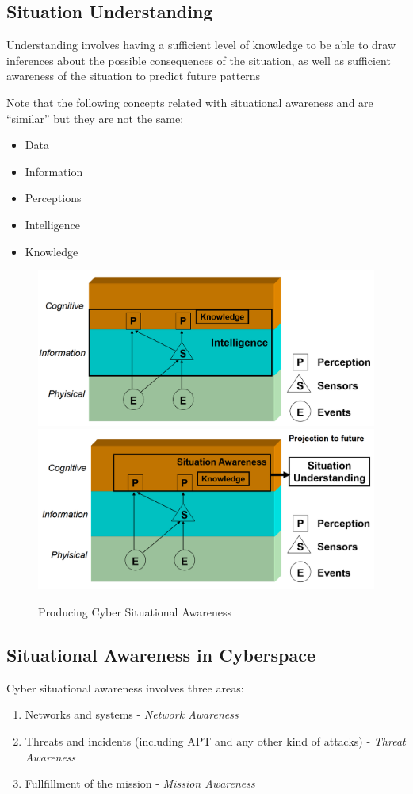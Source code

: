 \subsection{Situation Understanding}
\begin{definition}
   Understanding involves having a sufficient level of knowledge to be able to draw
   inferences about the possible consequences of the situation, as well as sufficient
   awareness of the situation to predict future patterns
\end{definition}

{Note that the following concepts related with situational awareness and are ``similar'' but they are not the same:\ns
\begin{itemize}
   \item Data
   \item Information
   \item Perceptions
   \item Intelligence
   \item Knowledge
\end{itemize}}

\begin{figure}[htbp]
   \centering
   \includegraphics[width=0.45\columnwidth]{images/01/producingCS1.png}
   \includegraphics[width=0.45\columnwidth]{images/01/producingCS2.png}
   \caption{Producing Cyber Situational Awareness}
   \label{fig:01/producingCS}
\end{figure}


\subsection{Situational Awareness in Cyberspace}
Cyber situational awareness involves three areas:
\begin{enumerate}
	\item Networks and systems - \textit{Network Awareness}
	\item Threats and incidents (including APT and any other kind of attacks) - \textit{Threat Awareness}
	\item Fullfillment of the mission - \textit{Mission Awareness}
\end{enumerate}

